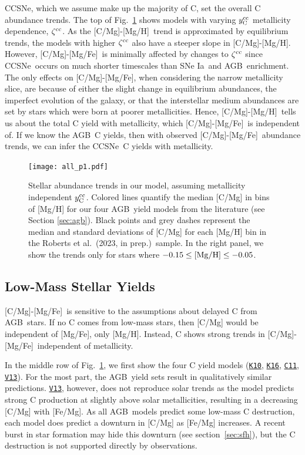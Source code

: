 \documentclass[fleqn,usenatbib]{mnras}
\newcommand{\citetjack}{Roberts et al.~(2023, in prep.)}
\newcommand{\cxi}{\texttt{\hyperlink{C11}{C11}}}
\newcommand{\kx}{\texttt{\hyperlink{K10}{K10}}}
\newcommand{\kxvi}{\texttt{\hyperlink{K16}{K16}}}
\newcommand{\vxiii}{\texttt{\hyperlink{V13}{V13}}}
\newcommand{\agb}{AGB}
\newcommand{\cc}{CCSNe}
\newcommand{\ia}{SNe Ia}
\newcommand{\caah}{[C/Mg]-[Mg/H]}
\newcommand{\caafe}{[C/Mg]-[Mg/Fe]}
\newcommand{\Ycc}{\ensuremath{y_{\rm C}^{\rm cc}}}
\begin{document}
\cc, which we assume make up the majority of C, set the overall C abundance trends.
The top of Fig.~\ref{fig:first_models} shows models with varying $\Ycc$ metallicity dependence, $\zeta^{\rm cc}$. As the \caah~trend is approximated by equilibrium trends, the models with higher $\zeta^{\rm cc}$ also have a steeper slope in \caah. 
However, \caafe~is minimally affected by changes to $\zeta^{\rm cc}$ since \cc\ occurs on much shorter timescales than \ia\ and \agb\ enrichment. The only effects on \caafe, when considering the narrow metallicity slice, are because of either the slight change in equilibrium abundances, the imperfect evolution of the galaxy, or that the interstellar medium abundances are set by stars which were born at poorer metallicities. 
 Hence, \caah\ tells us about the total C yield with metallicity, which \caafe\ is independent of. If we know the \agb\ C yields, then with observed \caafe\ abundance trends, we can infer the \cc\ C yields with metallicity.


\begin{figure}
\texttt{[image: all\_p1.pdf]}

\caption[]{
    Stellar abundance trends in our model, assuming metallicity independent $\Ycc$. Colored lines quantify the median [C/Mg] in bins of [Mg/H] for our four \agb\ yield models from the literature (see Section \ref{sec:agb}). Black points and grey dashes represent the median and standard deviations of [C/Mg] for each [Mg/H] bin in the \citetjack~sample. In the right panel, we show the trends only for stars where $-0.15\leq {\rm [Mg/H]}\leq -0.05$.
}
\label{fig:first_models}
\end{figure}

\subsection{Low-Mass Stellar Yields}\label{sec:agb_results}

\caafe\ is sensitive to the assumptions about delayed C from \agb\ stars. If no C comes from low-mass stars, then [C/Mg] would be independent of [Mg/Fe], only [Mg/H]. Instead, C shows strong trends  in \caafe\, independent of metallicity. 

In the middle row of Fig.~\ref{fig:first_models}, we first show the four C yield models (\kx, \kxvi, \cxi, \vxiii). For the most part, the \agb\ yield sets result in qualitatively similar predictions. \vxiii, however, does not reproduce solar trends as the model predicts strong C production at slightly above solar metallicities, resulting in a decreasing [C/Mg] with [Fe/Mg]. 
As all \agb\ models predict some low-mass C destruction, each model does predict a downturn in [C/Mg] as [Fe/Mg] increases. A recent burst in star formation may hide this downturn (see section~\ref{sec:sfh}), but the C destruction is not supported directly by observations. 
\end{document}
